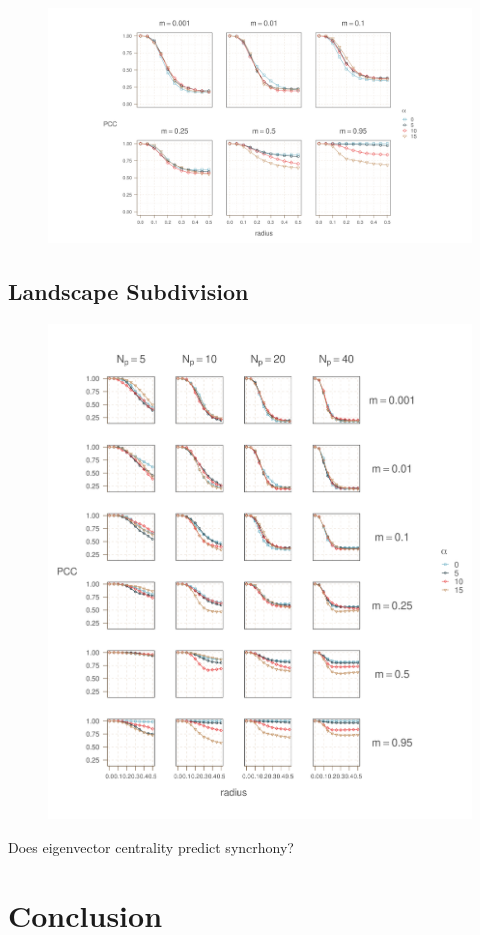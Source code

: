 \documentclass[]{article}
\begin{document}
\begin{figure}
    \includegraphics[width=15cm]{figs/figure9}
    \caption{}
    \label{}
\end{figure}

\hypertarget{simulating-a-phase-transition-across-a-migration-gradient}{%
\subsection{Landscape Subdivision}\label{simulating-a-phase-transition-across-a-migration-gradient}}

\begin{figure}
    \includegraphics[width=15cm]{figs/figure10}
    \caption{}
    \label{}
\end{figure}

Does eigenvector centrality predict syncrhony?


\hypertarget{conclusion}{%
\section{Conclusion}\label{conclusion}}

\clearpage
{
\footnotesize

}
\end{document}
